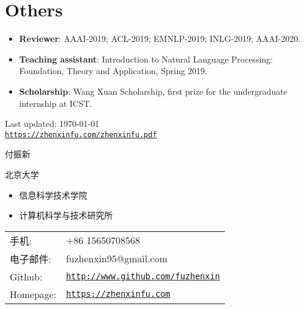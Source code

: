 \documentclass[letterpaper]{article}
\def\footerlink{https://zhenxinfu.com/zhenxinfu.pdf}
\begin{document}
\section*{Others}
\begin{itemize}
  \item \textbf{Reviewer}: AAAI-2019; ACL-2019; EMNLP-2019; INLG-2019; AAAI-2020.
  \item \textbf{Teaching assistant}: Introduction to Natural Language Processing: Foundation, Theory and Application, Spring 2019.
  \item \textbf{Scholarship}: Wang Xuan Scholarship, first prize for the undergraduate internship at ICST.
\end{itemize}


\bigskip


\begin{center}
  \begin{footnotesize}
    Last updated: \today \\
    \href{\footerlink}{\texttt{\footerlink}}
  \end{footnotesize}
\end{center}

\clearpage


{\huge 付振新}


\vspace{0.25in}

\begin{minipage}{0.45\linewidth}
  \begin{large}北京大学\end{large}
  \begin{itemize}
    \itemsep=-0.02in
      \item 信息科学技术学院
      \item 计算机科学与技术研究所
  \end{itemize}
  
\end{minipage}
\begin{minipage}{0.45\linewidth}
  \begin{tabular}{ll}
    手机: & +86 15650708568 \\
    电子邮件: & fuzhenxin95@gmail.com \\
    Github: & \href{https://www.github.com/fuzhenxin}{\tt http://www.github.com/fuzhenxin} \\
    Homepage: & \href{http://zhenxinfu.com}{\tt https://zhenxinfu.com} \\
  \end{tabular}
\end{minipage}
\end{document}
